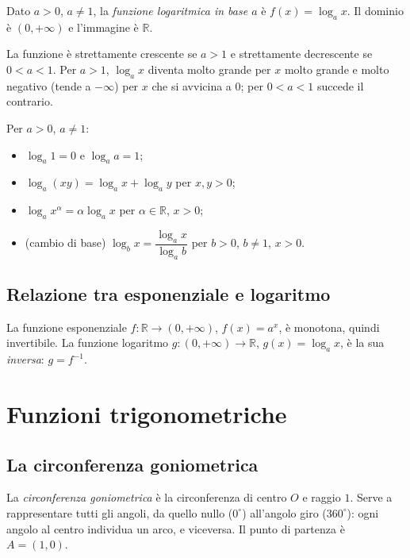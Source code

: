 \documentclass[11pt,a4paper]{article}
\begin{document}
\begin{definizione}
Dato $a > 0$, $a \ne 1$, la \emph{funzione logaritmica in base $a$} è $f(x) = \log_a x$. Il dominio è $(0, +\infty)$ e l'immagine è $\mathbb{R}$.
\end{definizione}

La funzione è strettamente crescente se $a > 1$ e strettamente decrescente se $0 < a < 1$. Per $a > 1$, $\log_a x$ diventa molto grande per $x$ molto grande e molto negativo (tende a $-\infty$) per $x$ che si avvicina a $0$; per $0 < a < 1$ succede il contrario.

\begin{proprieta}
Per $a > 0$, $a \ne 1$:
\begin{itemize}
    \item $\log_a 1 = 0$ e $\log_a a = 1$;
    \item $\log_a (xy) = \log_a x + \log_a y$ per $x, y > 0$;
    \item $\log_a x^\alpha = \alpha \log_a x$ per $\alpha \in \mathbb{R}$, $x > 0$;
    \item (cambio di base) $\log_b x = \dfrac{\log_a x}{\log_a b}$ per $b > 0$, $b \ne 1$, $x > 0$.
\end{itemize}
\end{proprieta}

\subsection*{Relazione tra esponenziale e logaritmo}

La funzione esponenziale $f : \mathbb{R} \to (0,+\infty)$, $f(x) = a^x$, è monotona, quindi invertibile. La funzione logaritmo $g : (0,+\infty) \to \mathbb{R}$, $g(x) = \log_a x$, è la sua \emph{inversa}: $g = f^{-1}$.

\section{Funzioni trigonometriche}

\subsection{La circonferenza goniometrica}

La \emph{circonferenza goniometrica} è la circonferenza di centro $O$ e raggio $1$. Serve a rappresentare tutti gli angoli, da quello nullo ($0^\circ$) all'angolo giro ($360^\circ$): ogni angolo al centro individua un arco, e viceversa. Il punto di partenza è $A = (1, 0)$.
\end{document}
